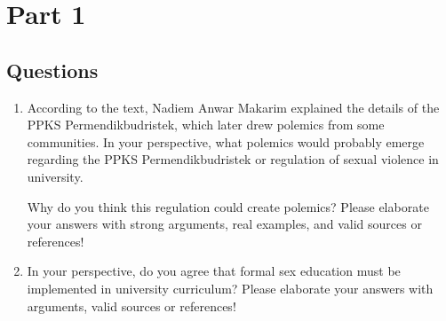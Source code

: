 \documentclass[12pt]{article}
\begin{document}
    \section*{Part 1}
    \subsection*{Questions}
    \begin{enumerate}
        \item According to the text, Nadiem Anwar Makarim explained the details
        of the PPKS Permendikbudristek, which later drew polemics from some communities.
        In your perspective, what polemics would probably emerge regarding the
        PPKS Permendikbudristek or regulation of sexual violence in university.
        
        Why do you think this regulation could create polemics? Please elaborate
        your answers with strong arguments, real examples, and valid sources or references!

        \item In your perspective, do you agree that formal sex education must
        be implemented in university curriculum? Please elaborate your answers
        with arguments, valid sources or references!
    \end{enumerate}
\end{document}
